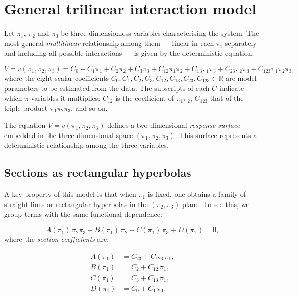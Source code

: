 \section{General trilinear interaction model}
\label{sec:trilinear-model}

Let \(\pi_1\), \(\pi_2\) and \(\pi_3\) be three dimensionless variables characterising the system. The most general \emph{multilinear} relationship among them — linear in each \(\pi_i\) separately and including all possible interactions — is given by the deterministic equation:

\begin{equation}\label{eq:general_model}
\boxed{
V = v(\pi_1,\pi_2,\pi_3) = C_0
    + C_1\pi_1
    + C_2\pi_2
    + C_3\pi_3
    + C_{12}\pi_1\pi_2
    + C_{13}\pi_1\pi_3
    + C_{23}\pi_2\pi_3
    + C_{123}\pi_1\pi_2\pi_3,
}
\end{equation}
where the eight scalar coefficients \(C_0, C_1, C_2, C_3, C_{12}, C_{13}, C_{23}, C_{123} \in \mathbb{R}\) are model parameters to be estimated from the data. The subscripts of each \(C\) indicate which \(\pi\) variables it multiplies: \(C_{12}\) is the coefficient of \(\pi_1\pi_2\), \(C_{123}\) that of the triple product \(\pi_1\pi_2\pi_3\), and so on.

The equation \(V = v(\pi_1,\pi_2,\pi_3)\) defines a two‑dimensional \emph{response surface} embedded in the three‑dimensional space \((\pi_1,\pi_2,\pi_3)\). This surface represents a deterministic relationship among the three variables.

\subsection{Sections as rectangular hyperbolas}
\label{sec:hyperbola-sections}

A key property of this model is that when \(\pi_1\) is fixed, one obtains a family of straight lines or rectangular hyperbolas in the \((\pi_2,\pi_3)\) plane. To see this, we group terms with the same functional dependence:

\begin{equation}\label{eq:conic_general}
A(\pi_1)\,\pi_2\pi_3 + B(\pi_1)\,\pi_2 + C(\pi_1)\,\pi_3 + D(\pi_1) = 0,
\end{equation}
where the \emph{section coefficients} are:

\begin{equation}\label{eq:ABCD}
\begin{aligned}
A(\pi_1) &= C_{23} + C_{123}\,\pi_1,\\
B(\pi_1) &= C_2 + C_{12}\,\pi_1,\\
C(\pi_1) &= C_3 + C_{13}\,\pi_1,\\
D(\pi_1) &= C_0 + C_1\,\pi_1.
\end{aligned}
\end{equation}


